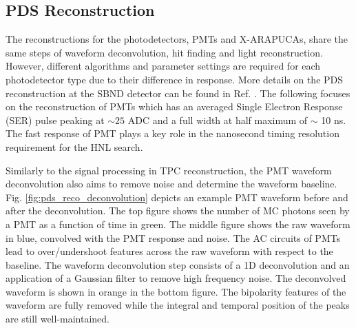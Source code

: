 \subsection{PDS Reconstruction}
\label{sec:reco_pds}

The reconstructions for the photodetectors, PMTs and X-ARAPUCAs, share the same steps of waveform deconvolution, hit finding and light reconstruction.
However, different algorithms and parameter settings are required for each photodetector type due to their difference in response.
More details on the PDS reconstruction at the SBND detector can be found in Ref. \cite{sbnd_pds_paper}.
The following focuses on the reconstruction of PMTs which has an averaged Single Electron Response 
(SER) pulse peaking at $\sim 25$ ADC and a full width at half maximum of $\sim$ 10 ns.
The fast response of PMT plays a key role in the nanosecond timing resolution requirement for the HNL 
search.

Similarly to the signal processing in TPC reconstruction, the PMT waveform deconvolution also aims to remove noise and determine the waveform baseline.
Fig. \ref{fig:pds_reco_deconvolution} \cite{sbnd_pds_paper} depicts an example PMT waveform before and after the deconvolution.
The top figure shows the number of MC photons seen by a PMT as a function of time in green.
The middle figure shows the raw waveform in blue, convolved with the PMT response and noise.
The AC circuits of PMTs lead to over/undershoot features across the raw waveform with respect to the baseline.
The waveform deconvolution step consists of a 1D deconvolution and an application of a Gaussian filter to 
remove high frequency noise.                                                                            
The deconvolved waveform is shown in orange in the bottom figure.
The bipolarity features of the waveform are fully removed while the integral and temporal position of the peaks are still well-maintained.

